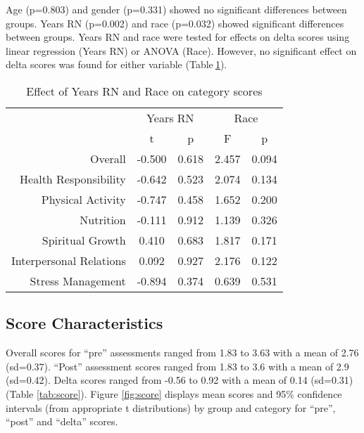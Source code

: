 \documentclass[]{article}
\begin{document}
Age (p=0.803) and gender (p=0.331) showed no significant differences
between groups. Years RN (p=0.002) and race (p=0.032) showed significant
differences between groups. Years RN and race were tested for effects on
delta scores using linear regression (Years RN) or ANOVA (Race).
However, no significant effect on delta scores was found for either
variable (Table\(~\)\ref{tab:effect}).

\begin{table}[hbt]
\centering
\caption{Effect of Years RN and Race on category scores}

\begin{tabular}{r|cccc}
& \multicolumn{2}{c}{Years RN} & \multicolumn{2}{c}{Race}\\

  & t & p &  F & p \\ 
  \hline
Overall & -0.500 & 0.618 & 2.457 & 0.094 \\ 
  Health Responsibility & -0.642 & 0.523 & 2.074 & 0.134 \\ 
  Physical Activity & -0.747 & 0.458 & 1.652 & 0.200 \\ 
  Nutrition & -0.111 & 0.912 & 1.139 & 0.326 \\ 
  Spiritual Growth & 0.410 & 0.683 & 1.817 & 0.171 \\ 
  Interpersonal Relations & 0.092 & 0.927 & 2.176 & 0.122 \\ 
  Stress Management & -0.894 & 0.374 & 0.639 & 0.531 \\ 
  \end{tabular}
    
\label{tab:effect}
\end{table}

\subsection{Score Characteristics}\label{score-characteristics}

Overall scores for ``pre'' assessments ranged from 1.83 to 3.63 with a
mean of 2.76 (sd=0.37). ``Post'' assessment scores ranged from 1.83 to
3.6 with a mean of 2.9 (sd=0.42). Delta scores ranged from -0.56 to 0.92
with a mean of 0.14 (sd=0.31) (Table \ref{tab:score}). Figure
\ref{fig:score} displays mean scores and 95\% confidence intervals (from
appropriate t distributions) by group and category for ``pre'', ``post''
and ``delta'' scores.
\end{document}
